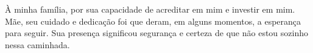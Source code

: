 À minha família, por sua capacidade de acreditar em mim e investir em mim. Mãe, seu cuidado e dedicação foi que deram, em alguns momentos, a esperança para seguir. Sua presença significou segurança e certeza de que não estou sozinho nessa caminhada.